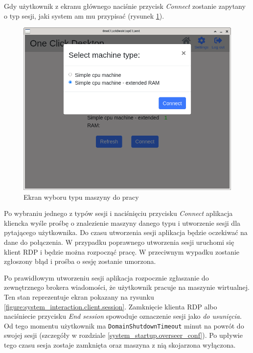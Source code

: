 \documentclass[../opis-rozwiazania.tex]{subfiles}
\begin{document}
Gdy użytkownik z ekranu głównego naciśnie przycisk \textit{Connect} zostanie zapytany o typ sesji, jaki system am mu przypisać (rysunek \ref{figure:system_interaction.client.select}).

\begin{figure}[h!]
  \centering
  \includegraphics[width=\textwidth]{resources/client_select.png}
  \caption{Ekran wyboru typu maszyny do pracy}
  \label{figure:system_interaction.client.select}
\end{figure}

Po wybraniu jednego z typów sesji i naciśnięciu przycisku \textit{Connect} aplikacja kliencka wyśle prośbę o znalezienie maszyny danego typu i utworzenie sesji dla pytającego użytkownika.
Do czasu utworzenia sesji aplikacja będzie oczekiwać na dane do połączenia.
W przypadku poprawnego utworzenia sesji uruchomi się klient RDP i będzie można rozpocząć pracę.
W przeciwnym wypadku zostanie zgłoszony błąd i prośba o sesję zostanie umorzona.

Po prawidłowym utworzeniu sesji aplikacja rozpocznie zgłaszanie do zewnętrznego brokera wiadomości, że użytkownik pracuje na maszynie wirtualnej.
Ten stan reprezentuje ekran pokazany na rysunku \ref{figure:system_interaction.client.session}.
Zamknięcie klienta RDP albo naciśniecie przycisku \textit{End session} spowoduje oznaczenie sesji jako \textit{do usunięcia}.
Od tego momentu użytkownik ma \texttt{DomainShutdownTimeout} minut na powrót do swojej sesji (szczegóły w rozdziale \ref{system_startup.overseer_conf}).
Po upływie tego czasu sesja zostaje zamknięta oraz maszyna z nią skojarzona wyłączona.
\end{document}

